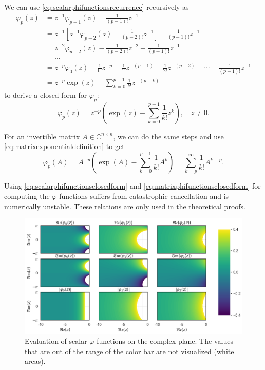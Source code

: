 We can use \eqref{eq:scalarphifunctionsrecurrence} recursively as
\begin{equation*}
    \begin{aligned}
        \varphi_p(z) & = z^{-1} \varphi_{p-1}(z) - \frac{1}{(p-1)!} z^{-1} \\
        & = z^{-1} \left[ z^{-1} \varphi_{p-2}(z) - \frac{1}{(p-2)!} z^{-1} \right] - \frac{1}{(p-1)!} z^{-1} \\
        & = z^{-2} \varphi_{p-2}(z) - \frac{1}{(p-2)!} z^{-2} - \frac{1}{(p-1)!} z^{-1} \\
        & = \cdots \\
        & = z^{-p} \varphi_{0}(z) - \frac{1}{0!} z^{-p} - \frac{1}{1!} z^{-(p-1)} - \frac{1}{2!} z^{-(p-2)} - \cdots - \frac{1}{(p-1)!} z^{-1} \\
        & = z^{-p} \exp(z) - \sum_{k=0}^{p-1}{\frac{1}{k!}z^{-(p-k)}}
        \end{aligned}
\end{equation*}
to derive a closed form for $\varphi_p$:
\begin{equation}
    \label{eq:scalarphifunctionsclosedform}
    \varphi_p(z) = z^{-p} \left( \exp(z) - \sum_{k=0}^{p-1}{\frac{1}{k!}z^{k}} \right), \quad z \neq 0.
\end{equation}

For an invertible matrix $A \in \mathbb{C}^{n \times n}$, we can do the same steps
and use \eqref{eq:matrixexponentialdefinition} to get
\begin{equation}
    \label{eq:matrixphifunctionsclosedform}
    \varphi_p(A) = A^{-p} \left( \exp(A) - \sum_{k=0}^{p-1}{\frac{1}{k!}A^{k}} \right)
    = \sum_{k=p}^{\infty}{\frac{1}{k!} A^{k-p}}.
\end{equation}

\begin{remark}
    Using \eqref{eq:scalarphifunctionsclosedform} and \eqref{eq:matrixphifunctionsclosedform}
    for computing the $\varphi$-functions suffers from catastrophic cancellation and
    is numerically unstable. These relations are only used in the theoretical proofs.
\end{remark}

\begin{figure}[h]
    \centering
    \includegraphics[width=.7\textwidth]{img/scalarcomplexplane.png}
    \caption{
        Evaluation of scalar $\varphi$-functions on the complex plane.
        The values that are out of the range of the color bar are not
        visualized (white areas).
        }
    \label{fig:scalarphifunctionscomplexplane}
\end{figure}

